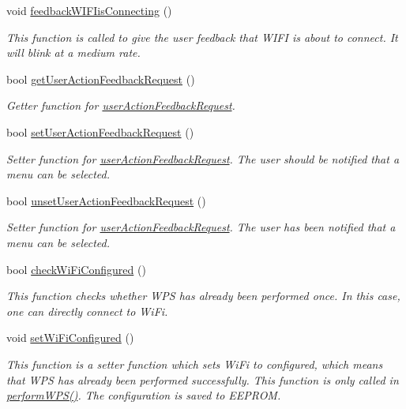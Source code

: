 \begin{DoxyCompactItemize}
void \hyperlink{WIFIOnOff_8ino_a29d61ce203f552333381a79f4993da69}{feedback\-W\-I\-F\-Iis\-Connecting} ()
\begin{DoxyCompactList}\small\item\em This function is called to give the user feedback that W\-I\-F\-I is about to connect. It will blink at a medium rate. \end{DoxyCompactList}\item 
bool \hyperlink{WIFIOnOff_8ino_a347d10bac439b6c073df93cbf5522f28}{get\-User\-Action\-Feedback\-Request} ()
\begin{DoxyCompactList}\small\item\em Getter function for \hyperlink{WIFIOnOff_8ino_a3e5c7c27259449622535aee1125f275a}{user\-Action\-Feedback\-Request}. \end{DoxyCompactList}\item 
bool \hyperlink{WIFIOnOff_8ino_a0185fd92dbcb609528b98244ee37430c}{set\-User\-Action\-Feedback\-Request} ()
\begin{DoxyCompactList}\small\item\em Setter function for \hyperlink{WIFIOnOff_8ino_a3e5c7c27259449622535aee1125f275a}{user\-Action\-Feedback\-Request}. The user should be notified that a menu can be selected. \end{DoxyCompactList}\item 
bool \hyperlink{WIFIOnOff_8ino_a2f07f10222db3144a4a271ddcb81cdde}{unset\-User\-Action\-Feedback\-Request} ()
\begin{DoxyCompactList}\small\item\em Setter function for \hyperlink{WIFIOnOff_8ino_a3e5c7c27259449622535aee1125f275a}{user\-Action\-Feedback\-Request}. The user has been notified that a menu can be selected. \end{DoxyCompactList}\item 
bool \hyperlink{WIFIOnOff_8ino_a7ed5532c3a832fa15a2865ee80cbfdda}{check\-Wi\-Fi\-Configured} ()
\begin{DoxyCompactList}\small\item\em This function checks whether W\-P\-S has already been performed once. In this case, one can directly connect to Wi\-Fi. \end{DoxyCompactList}\item 
void \hyperlink{WIFIOnOff_8ino_a3ebcee2a9d20137810223c6813e54787}{set\-Wi\-Fi\-Configured} ()
\begin{DoxyCompactList}\small\item\em This function is a setter function which sets Wi\-Fi to configured, which means that W\-P\-S has already been performed successfully. This function is only called in \hyperlink{WIFIOnOff_8ino_aa51eb2a71952e54dba6130be21b3a1d7}{perform\-W\-P\-S()}. The configuration is saved to E\-E\-P\-R\-O\-M. \end{DoxyCompactList}\item 

\end{DoxyCompactItemize}
